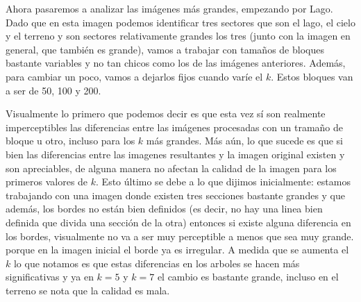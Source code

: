 \documentclass[a4paper]{article}
\begin{document}
Ahora pasaremos a analizar las imágenes más grandes, empezando por Lago. Dado que en esta imagen podemos identificar tres sectores que son el lago, el cielo y el terreno y son sectores relativamente grandes los tres (junto con la imagen en general, que también es grande), vamos a trabajar con tamaños de bloques bastante variables y no tan chicos como los de las imágenes anteriores. Además, para cambiar un poco, vamos a dejarlos fijos cuando varíe el $k$. Estos bloques van a ser de 50, 100 y 200. 
\par Visualmente lo primero que podemos decir es que esta vez sí son realmente imperceptibles las diferencias entre las imágenes procesadas con un tramaño de bloque u otro, incluso para los $k$ más grandes. Más aún, lo que sucede es que si bien las diferencias entre las imagenes resultantes y la imagen original existen y son apreciables, de alguna manera no afectan la calidad de la imagen para los primeros valores de $k$. Esto último se debe a lo que dijimos inicialmente: estamos trabajando con una imagen donde existen tres secciones bastante grandes y que además, los bordes no están bien definidos (es decir, no hay una linea bien definida que divida una sección de la otra) entonces si existe alguna diferencia en los bordes, visualmente no va a ser muy perceptible a menos que sea muy grande. porque en la imagen inicial el borde ya es irregular. A medida que se aumenta el $k$ lo que notamos es que estas diferencias en los arboles se hacen más significativas y ya en $k = 5$ y $k = 7$   el cambio es bastante grande, incluso en el terreno se nota que la calidad es mala.
\end{document}
